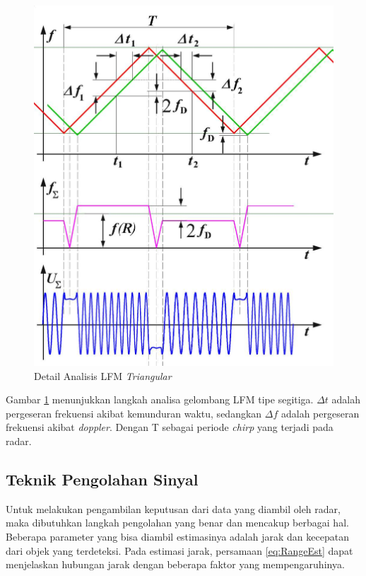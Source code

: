 \begin{figure}
	\begin{center}
		\includegraphics[scale=0.3]{pics/bab2/DetailMod.jpg}
		\caption[Detail Analisa LFM \textit{Triangular}]{Detail Analisis LFM \textit{Triangular}}
		\label{pic:DetailMod}
	\end{center}
\end{figure}

Gambar \ref{pic:DetailMod} menunjukkan langkah analisa gelombang LFM tipe segitiga. $\Delta t$ adalah pergeseran frekuensi akibat kemunduran waktu, sedangkan $\Delta f$ adalah pergeseran frekuensi akibat \textit{doppler}. Dengan T sebagai periode \textit{chirp} yang terjadi pada radar.

\subsection{Teknik Pengolahan Sinyal}
Untuk melakukan pengambilan keputusan dari data yang diambil oleh radar, maka dibutuhkan langkah pengolahan yang benar dan mencakup berbagai hal. Beberapa parameter yang bisa diambil estimasinya adalah jarak dan kecepatan dari objek yang terdeteksi. Pada estimasi jarak, persamaan \ref{eq:RangeEst} dapat menjelaskan hubungan jarak dengan beberapa faktor yang mempengaruhinya.


